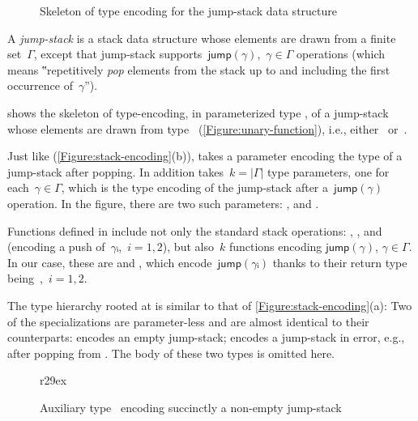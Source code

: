 \begin{wrapfigure}[19]{r}{44ex}
  \caption{Skeleton of type encoding for the jump-stack data structure}%
  \label{Figure:jump}%
\end{wrapfigure}

A \emph{jump-stack} is a stack data structure whose elements are drawn from a finite set~$Γ$,
  except that jump-stack supports~$\textsf{jump}(γ)$,~$γ∈Γ$ operations
  (which means ‟repetitively \emph{pop} elements from the stack up 
  to and including the first occurrence of~$γ$”).

 shows the skeleton of type-encoding, in parameterized type ,  
  of a jump-stack whose elements are drawn from type~
(\cref{Figure:unary-function}), i.e., either~ or~.

Just like  (\cref{Figure:stack-encoding}(b)),  takes 
  a  parameter encoding the type of a jump-stack after popping. %
In addition  takes~$k=|Γ|$ type parameters, one for each~$γ∈Γ$,
  which is the type encoding of the jump-stack after a~$\textsf{jump}(γ)$
  operation.
In the figure, there are two such parameters: , and
  .

Functions defined in  include not only the standard stack operations: ,
,  and~ (encoding a push of~$γᵢ$,~$i=1,2$),
but also~$k$ functions encoding $\textsf{jump}(\gamma)$, $\gamma \in \Gamma$.
In our case, these are  and ,
  which encode~$\textsf{jump}(γᵢ)$
  thanks to their return type being~,~$i=1,2$.

The type hierarchy rooted at  is similar to that of
\cref{Figure:stack-encoding}(a):
Two of the specializations are parameter-less and are
  almost identical to their 
  counterparts:
 encodes an empty jump-stack;  encodes a jump-stack in error,
e.g., after popping from .
The body of these two types is omitted here.

\begin{wrapfigure}[12]r{29ex}
  \caption{\label{Figure:jump-stack-push} Auxiliary type~ encoding succinctly a non-empty jump-stack}
\end{wrapfigure}

